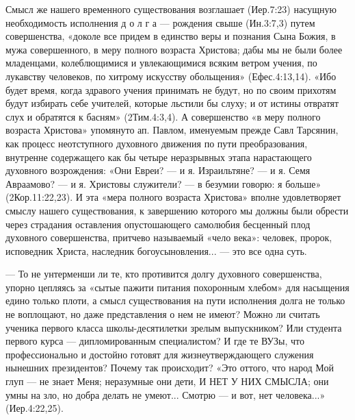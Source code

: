 Смысл же нашего временного существования возглашает (Иер.7:23) насущную необходимость исполнения  д о л г а  --- рождения свыше (Ин.3:7,3) путем совершенства, «доколе все придем в единство веры и познания Сына Божия, в мужа совершенного, в меру полного возраста Христова;  дабы мы не были более младенцами, колеблющимися и увлекающимися всяким ветром учения, по лукавству человеков, по хитрому искусству обольщения» (Ефес.4:13,14).  «Ибо будет время, когда здравого учения принимать не будут, но по своим прихотям будут избирать себе учителей, которые льстили бы слуху; и от истины отвратят слух и обратятся к басням» (2Тим.4:3,4).
    А совершенство «в меру полного возраста Христова» упомянуто ап. Павлом, именуемым прежде Савл Тарсянин, как процесс неотступного духовного движения по пути преобразования, внутренне содержащего как бы четыре неразрывных этапа нарастающего духовного возрождения: «Они Евреи? --- и я. Израильтяне? --- и я. Семя Авраамово? --- и я. Христовы служители? --- в безумии говорю: я больше» (2Кор.11:22,23).  И эта «мера полного возраста Христова» вполне удовлетворяет смыслу нашего существования, к завершению которого мы должны были обрести через страдания оставления опустошающего самолюбия бесценный плод духовного совершенства, притчево называемый «чело века»: человек, пророк, исповедник Христа, наследник богоусыновления... --- это все одна суть.

 --- То не унтерменши ли те, кто противится долгу духовного совершенства, упорно цепляясь за «сытые пажити питания похоронным хлебом» для насыщения едино только плоти, а смысл существования на пути исполнения долга не только не воплощают, но даже представления о нем не имеют?
Можно ли считать ученика первого класса школы-десятилетки зрелым выпускником? Или студента первого курса --- дипломированным специалистом? И где те ВУЗы, что профессионально и достойно готовят для жизнеутверждающего служения нынешних президентов? Почему так происходит?
     «Это оттого, что народ Мой глуп --- не знает Меня; неразумные они дети, И  НЕТ  У  НИХ  СМЫСЛА;  они умны на зло, но добра делать не умеют... Смотрю --- и вот, нет человека...» (Иер.4:22,25).

